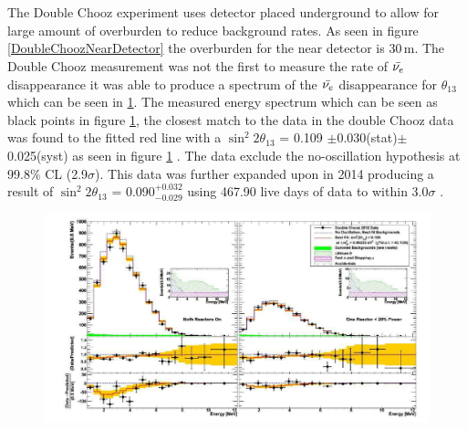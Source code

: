 \\\\The Double Chooz experiment uses detector placed underground to allow for large amount of overburden to reduce background rates. As seen in figure \ref{DoubleChoozNearDetector} the overburden for the near detector is 30\,m\cite{lasserre2006}. The Double Chooz measurement  was not the first to measure the rate of $\Bar{\nu_e}$ disappearance \cite{reno_may_2012} it was able to produce a spectrum of the $\Bar{\nu_e}$ disappearance for $\theta_{13}$ which can be seen in \ref{doubleChoozSpectrumNoCaption}. The measured energy spectrum which can be seen as black points in figure \ref{doubleChoozSpectrumNoCaption}, the closest match to the data in the double Chooz data was found to the fitted red line with a $\sin^2{2\theta_{13}}$ = 0.109 $\pm$0.030(stat)$\pm$0.025(syst) as seen in figure \ref{doubleChoozSpectrumNoCaption} \cite{Abe_2012}. The data exclude the no-oscillation hypothesis at 99.8$\%$ CL (2.9$\sigma$)\cite{Abe_2012}. This data was further expanded upon in 2014 producing a result of $\sin^2{2\theta_{13}}$ = 0.090$^{+0.032}_{-0.029}$ using 467.90 live days of data to within $3.0\sigma$ \cite{abe2014improved}.
\begin{figure}[htbp]
 \centering
 \includegraphics[width=\linewidth]{Chapter2/Figs/Raster/doubleChoozSpectrumNoCaption.png} %
 \label{doubleChoozSpectrumNoCaption}
\end{figure}
